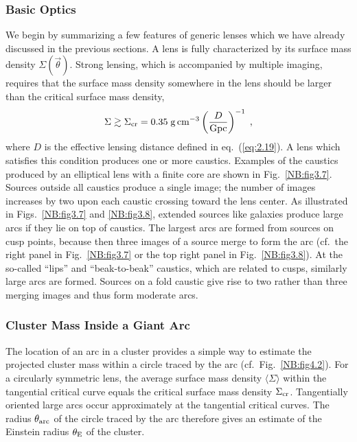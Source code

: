 \documentclass[a4paper,10pt]{article} %
\newcommand{\ga}{\gtrsim}
\begin{document}
\subsubsection{Basic Optics}
\label{NB:subsubsect4.1.1}

We begin by summarizing a few features of generic lenses which we have
already discussed in the previous sections. A lens is fully
characterized by its surface mass density $\Sigma(\vec\theta)$. Strong
lensing, which is accompanied by multiple imaging, requires that the
surface mass density somewhere in the lens should be larger than the
critical surface mass density,
\begin{equation}
  \Sigma\ga\Sigma_{\rm cr} = 0.35\;{\rm g}\,{\rm cm}^{-3}
  \left(\frac{D}{{\rm Gpc}}\right)^{-1}\;,
\label{eq:4.1}
\end{equation}
where $D$ is the effective lensing distance defined in eq.\
(\ref{eq:2.19}). A lens which satisfies this condition produces one or
more caustics. Examples of the caustics produced by an elliptical lens
with a finite core are shown in Fig.\ \ref{NB:fig3.7}. Sources outside
all caustics produce a single image; the number of images increases by
two upon each caustic crossing toward the lens center. As illustrated
in Figs.\ \ref{NB:fig3.7} and \ref{NB:fig3.8}, extended sources like
galaxies produce large arcs if they lie on top of caustics. The
largest arcs are formed from sources on cusp points, because then
three images of a source merge to form the arc (cf.\ the right panel
in Fig.\ \ref{NB:fig3.7} or the top right panel in Fig.\
\ref{NB:fig3.8}). At the so-called ``lips'' and ``beak-to-beak''
caustics, which are related to cusps, similarly large arcs are
formed. Sources on a fold caustic give rise to two rather than three
merging images and thus form moderate arcs.

\subsubsection{Cluster Mass Inside a Giant Arc}
\label{NB:subsubsect4.1.2}

The location of an arc in a cluster provides a simple way to estimate
the projected cluster mass within a circle traced by the arc (cf.\
Fig.\ \ref{NB:fig4.2}). For a circularly symmetric lens, the average
surface mass density $\langle\Sigma\rangle$ within the tangential
critical curve equals the critical surface mass density $\Sigma_{\rm
cr}$. Tangentially oriented large arcs occur approximately at the
tangential critical curves. The radius $\theta_{\rm arc}$ of the
circle traced by the arc therefore gives an estimate of the Einstein
radius $\theta_{\rm E}$ of the cluster.
\end{document}
